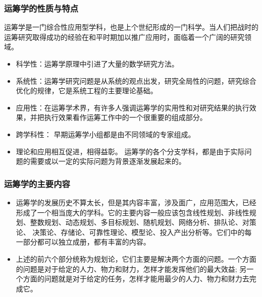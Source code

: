 \subsubsection{运筹学的性质与特点}
\begin{frame}{\subsubsecname}
    运筹学是一门综合性应用型学科，也是上个世纪形成的一门科学。当人们把战时的运筹研究取得成功的经验在和平时期加以推广应用时，面临着一个广阔的研究领域。
\begin{itemize}
    \item 科学性：运筹学原理中引进了大量的数学研究方法。
\item 系统性：运筹学研究问题是从系统的观点出发，研究全局性的问题，研究综合优化的规律，它是系统工程的主要理论基础。
\item 应用性：在运筹学术界，有许多人强调运筹学的实用性和对研究结果的执行效果，并把执行效果看作运筹工作中的一个很重要的组成部分。
\item 跨学科性：
早期运筹学小组都是由不同领域的专家组成。
\item 理论和应用相互促进，相得益彰。
运筹学的各个分支学科，都是由于实际问题的需要或以一定的实际问题为背景逐渐发展起来的。
\end{itemize}
\end{frame}

\subsubsection{运筹学的主要内容}
\begin{frame}{\subsubsecname}
\begin{itemize}
    \item 运筹学的发展历史不算太长，但是其内容丰富，涉及面广，应用范围大，已经形成了一个相当庞大的学科。它的主要内容一般应该包含线性规划、非线性规划、整数规划、动态规划、多目标规划、随机规划、网络分析、排队论、对策论、 决策论、存储论、可靠性理论、模型论、投入产出分析等。它们中的每一部分都可以独立成册，都有丰富的内容。
    \item 上述的前六个部分统称为规划论，它们主要是解决两个方面的问题。一个方面的问题是对于给定的人力、物力和财力，怎样才能发挥他们的最大效益; 另一个方面的问题就是对于给定的任务，怎样才能用最少的人力、物力和财力去完成它。
\end{itemize}
\end{frame}

